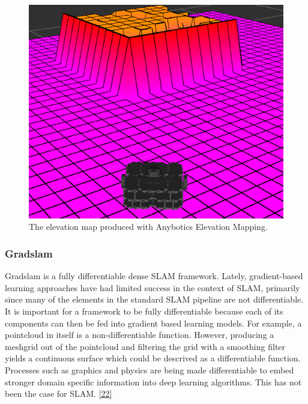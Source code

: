 \documentclass{article}
\begin{document}
\begin{figure}[h] %
    \centering
	\includegraphics[width=\textwidth,height=\textheight,keepaspectratio]{report1-img025.png} %
	\caption{The elevation map produced with Anybotics Elevation Mapping. }
\end{figure}

\clearpage

\subsubsection{Gradslam}

Gradslam is a fully differentiable dense SLAM framework. Lately, gradient-based learning approaches have had limited success in the context of SLAM, primarily since many of the elements in the standard SLAM pipeline are not differentiable. It is important for a framework to be fully differentiable because each of its components can then be fed into gradient based learning models. For example, a pointcloud in itself is a non-differentiable function. However, producing a meshgrid out of the pointcloud and filtering the grid with a smoothing filter yields a continuous surface which could be descrived as a differentiable function. Processes such as graphics and physics are being made differentiable to embed stronger domain specific information into deep learning algorithms. This has not been the case for SLAM. \href{https://arxiv.org/pdf/1910.10672.pdf}{[22]}
\end{document}
